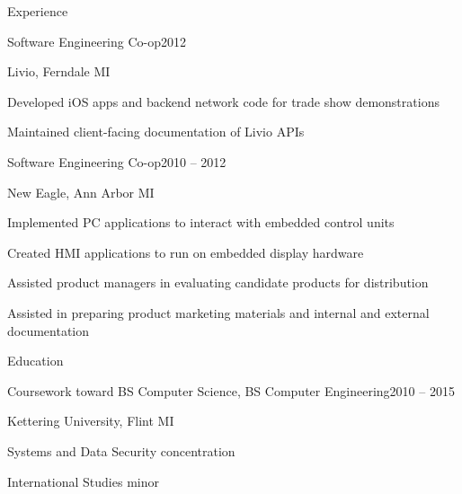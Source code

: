 \documentclass[letterpaper,12pt,oneside,compact]{article}
\begin{document}
\begin{heading}{Experience}
\begin{resitem}{Software Engineering Co-op\hfill 2012}
\item Livio, Ferndale MI
\item Developed iOS apps and backend network code for trade show demonstrations
\item Maintained client-facing documentation of Livio APIs
\end{resitem}

\begin{resitem}{Software Engineering Co-op\hfill 2010 -- 2012}
\item New Eagle, Ann Arbor MI
\item Implemented PC applications to interact with embedded control units
\item Created HMI applications to run on embedded display hardware
\item Assisted product managers in evaluating candidate products for distribution
\item Assisted in preparing product marketing materials and internal and 
      external documentation
\end{resitem}
\end{heading}

\begin{heading}{Education}
	\begin{resitem}{Coursework toward BS Computer Science, BS Computer Engineering\hfill 2010 -- 2015}
		\item Kettering University, Flint MI
		\item Systems and Data Security concentration
		\item International Studies minor
	\end{resitem}
\end{heading}
\end{document}
